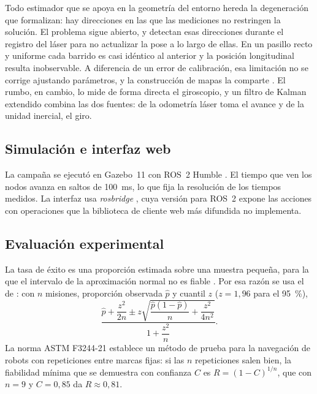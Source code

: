 Todo estimador que se apoya en la geometría del entorno hereda la degeneración que \textcite{zhang2016degeneracy} formalizan: hay direcciones en las que las mediciones no restringen la solución. El problema sigue abierto, y \textcite{tuna2024xicp} detectan esas direcciones durante el registro del láser para no actualizar la pose a lo largo de ellas. En un pasillo recto y uniforme cada barrido es casi idéntico al anterior y la posición longitudinal resulta inobservable. A diferencia de un error de calibración, esa limitación no se corrige ajustando parámetros, y la construcción de mapas la comparte \autocite{macenski2021slam}. El rumbo, en cambio, lo mide de forma directa el giroscopio, y un filtro de Kalman extendido \autocite{moore2014generalized} combina las dos fuentes: de la odometría láser toma el avance y de la unidad inercial, el giro.

\subsection{Simulación e interfaz web}

La campaña se ejecutó en Gazebo~11 con ROS~2 Humble \autocite{koenig2004gazebo}. El tiempo que ven los nodos avanza en saltos de 100~ms, lo que fija la resolución de los tiempos medidos. La interfaz usa \textit{rosbridge} \autocite{crick2017rosbridge}, cuya versión para ROS~2 expone las acciones con operaciones que la biblioteca de cliente web más difundida no implementa.

\subsection{Evaluación experimental}

La tasa de éxito es una proporción estimada sobre una muestra pequeña, para la que el intervalo de la aproximación normal no es fiable \autocite{brown2001interval}. Por esa razón se usa el de \textcite{wilson1927probable}: con $n$ misiones, proporción observada $\hat{p}$ y cuantil $z$ ($z = 1{,}96$ para el 95~\%),
\begin{equation}
  \frac{\hat{p} + \dfrac{z^{2}}{2n} \pm z\sqrt{\dfrac{\hat{p}(1-\hat{p})}{n} + \dfrac{z^{2}}{4n^{2}}}}{1 + \dfrac{z^{2}}{n}} .
\end{equation}
La norma ASTM F3244-21 \autocite{astm2021f3244} establece un método de prueba para la navegación de robots con repeticiones entre marcas fijas: si las $n$ repeticiones salen bien, la fiabilidad mínima que se demuestra con confianza $C$ es $R = (1-C)^{1/n}$, que con $n = 9$ y $C = 0{,}85$ da $R \approx 0{,}81$.


